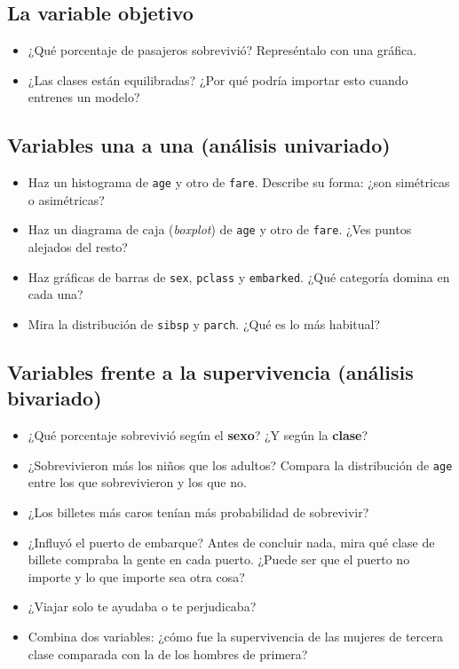 \documentclass[11pt,a4paper]{article}
\newcommand{\col}[1]{\texttt{#1}}
\begin{document}
\subsection{La variable objetivo}
\begin{itemize}
  \item ¿Qué porcentaje de pasajeros sobrevivió? Represéntalo con una gráfica.
  \item ¿Las clases están equilibradas? ¿Por qué podría importar esto cuando entrenes un modelo?
\end{itemize}

\subsection{Variables una a una (análisis univariado)}
\begin{itemize}
  \item Haz un histograma de \col{age} y otro de \col{fare}. Describe su forma: ¿son
        simétricas o asimétricas?
  \item Haz un diagrama de caja (\emph{boxplot}) de \col{age} y otro de \col{fare}.
        ¿Ves puntos alejados del resto?
  \item Haz gráficas de barras de \col{sex}, \col{pclass} y \col{embarked}. ¿Qué
        categoría domina en cada una?
  \item Mira la distribución de \col{sibsp} y \col{parch}. ¿Qué es lo más habitual?
\end{itemize}

\subsection{Variables frente a la supervivencia (análisis bivariado)}
\begin{itemize}
  \item ¿Qué porcentaje sobrevivió según el \textbf{sexo}? ¿Y según la \textbf{clase}?
  \item ¿Sobrevivieron más los niños que los adultos? Compara la distribución de
        \col{age} entre los que sobrevivieron y los que no.
  \item ¿Los billetes más caros tenían más probabilidad de sobrevivir?
  \item ¿Influyó el puerto de embarque? Antes de concluir nada, mira qué clase de billete
        compraba la gente en cada puerto. ¿Puede ser que el puerto no importe y lo que
        importe sea otra cosa?
  \item ¿Viajar solo te ayudaba o te perjudicaba?
  \item Combina dos variables: ¿cómo fue la supervivencia de las mujeres de tercera clase
        comparada con la de los hombres de primera?
\end{itemize}
\end{document}
